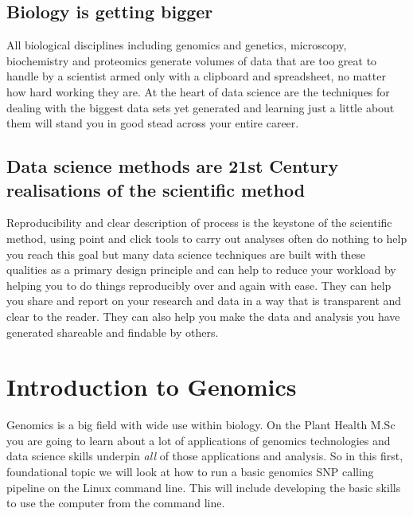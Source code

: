 \documentclass[
]{book}
\begin{document}
\hypertarget{biology-is-getting-bigger}{%
\section{Biology is getting bigger}\label{biology-is-getting-bigger}}

All biological disciplines including genomics and genetics, microscopy, biochemistry and proteomics generate volumes of data that are too great to handle by a scientist armed only with a clipboard and spreadsheet, no matter how hard working they are. At the heart of data science are the techniques for dealing with the biggest data sets yet generated and learning just a little about them will stand you in good stead across your entire career.

\hypertarget{data-science-methods-are-21st-century-realisations-of-the-scientific-method}{%
\section{Data science methods are 21st Century realisations of the scientific method}\label{data-science-methods-are-21st-century-realisations-of-the-scientific-method}}

Reproducibility and clear description of process is the keystone of the scientific method, using point and click tools to carry out analyses often do nothing to help you reach this goal but many data science techniques are built with these qualities as a primary design principle and can help to reduce your workload by helping you to do things reproducibly over and again with ease. They can help you share and report on your research and data in a way that is transparent and clear to the reader. They can also help you make the data and analysis you have generated shareable and findable by others.

\hypertarget{introduction-to-genomics}{%
\chapter{Introduction to Genomics}\label{introduction-to-genomics}}

Genomics is a big field with wide use within biology. On the Plant Health M.Sc you are going to learn about a lot of applications of genomics technologies and data science skills underpin \emph{all} of those applications and analysis. So in this first, foundational topic we will look at how to run a basic genomics SNP calling pipeline on the Linux command line. This will include developing the basic skills to use the computer from the command line.
\end{document}
